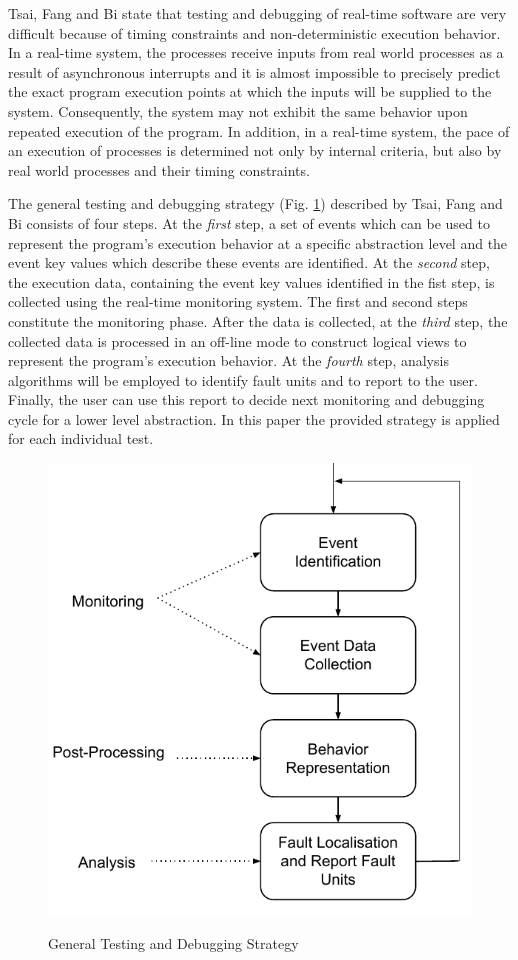 Tsai, Fang and Bi\cite{rtSandD} state that testing and debugging of real-time software are very difficult because of timing constraints and non-deterministic execution behavior. In a real-time system, the processes receive inputs from real world processes as a result of asynchronous interrupts and it is almost impossible to precisely predict the exact program execution points at which the inputs will be supplied to the system. Consequently, the system may not exhibit the same behavior upon repeated execution of the program. In addition, in a real-time system, the pace of an execution of processes is determined not only by internal criteria, but also by real world processes and their timing constraints. 

The general testing and debugging strategy (Fig. \ref{fig:GeneralTestingAndDebugging}) described by Tsai, Fang and Bi \cite{rtSandD} consists of four steps.
At the \textit{first} step, a set of events which can be used to represent the program's execution behavior at a specific abstraction level and the event key values which describe these events are identified. 
At the \textit{second} step, the execution data, containing the event key values identified in the fist step, is collected using the real-time monitoring system. 
The first and second steps constitute the monitoring phase. After the data is collected, at the \textit{third} step, the collected data is processed in an off-line mode to construct logical views to represent the program's execution behavior.
At the \textit{fourth} step, analysis algorithms will be employed to identify fault units and to report to the user. 
Finally, the user can use this report to decide next monitoring and debugging cycle for a lower level abstraction.
In this paper the provided strategy is applied for each individual test.

\begin{figure}[ht]
	\centering
	\includegraphics[width=0.7\linewidth]{grafiken/GeneralTestingAndDebugging}
	\label{fig:GeneralTestingAndDebugging}
	\caption{General Testing and Debugging Strategy\cite{rtSandD}}
\end{figure}

